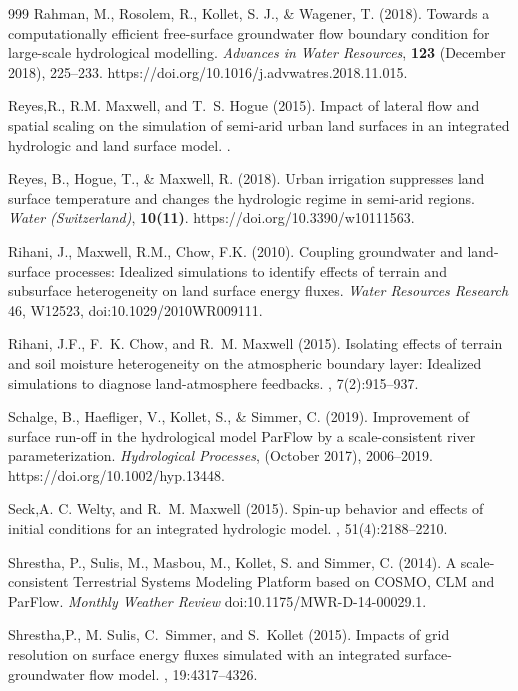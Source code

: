 \begin{thebibliography}{999}
Rahman, M., Rosolem, R., Kollet, S. J., \& Wagener, T. (2018). Towards a computationally efficient free-surface groundwater flow boundary condition for large-scale hydrological modelling. {\em Advances in Water Resources}, {\bf 123} (December 2018), 225–233. https://doi.org/10.1016/j.advwatres.2018.11.015.

Reyes,R., R.M. Maxwell, and T.~S. Hogue (2015).
\newblock Impact of lateral flow and spatial scaling on the simulation of
  semi-arid urban land surfaces in an integrated hydrologic and land surface
  model.
.

Reyes, B., Hogue, T., \& Maxwell, R. (2018). Urban irrigation suppresses land surface temperature and changes the hydrologic regime in semi-arid regions. {\em Water (Switzerland)}, {\bf 10(11)}. https://doi.org/10.3390/w10111563.


Rihani, J., Maxwell, R.M., Chow, F.K. (2010). Coupling groundwater and land-surface processes: Idealized simulations to identify effects of terrain and subsurface heterogeneity on land surface energy fluxes. {\em Water Resources Research} 46, W12523, doi:10.1029/2010WR009111.


Rihani, J.F., F.~K. Chow, and R.~M. Maxwell (2015).
\newblock Isolating effects of terrain and soil moisture heterogeneity on the
  atmospheric boundary layer: Idealized simulations to diagnose land-atmosphere
  feedbacks.
, 7(2):915--937.

Schalge, B., Haefliger, V., Kollet, S., \& Simmer, C. (2019). Improvement of surface run-off in the hydrological model ParFlow by a scale-consistent river parameterization. {\em Hydrological Processes}, (October 2017), 2006–2019. https://doi.org/10.1002/hyp.13448.

Seck,A. C. Welty, and R.~M. Maxwell (2015).
\newblock Spin-up behavior and effects of initial conditions for an integrated
  hydrologic model.
, 51(4):2188--2210.


Shrestha, P., Sulis, M., Masbou, M., Kollet, S. and Simmer, C. (2014). A scale-consistent Terrestrial Systems Modeling Platform based on COSMO, CLM and ParFlow. {\em Monthly Weather Review} doi:10.1175/MWR-D-14-00029.1.

Shrestha,P., M. Sulis, C.~Simmer, and S.~Kollet (2015).
\newblock Impacts of grid resolution on surface energy fluxes simulated with an
  integrated surface-groundwater flow model.
, 19:4317--4326.


\end{thebibliography}
